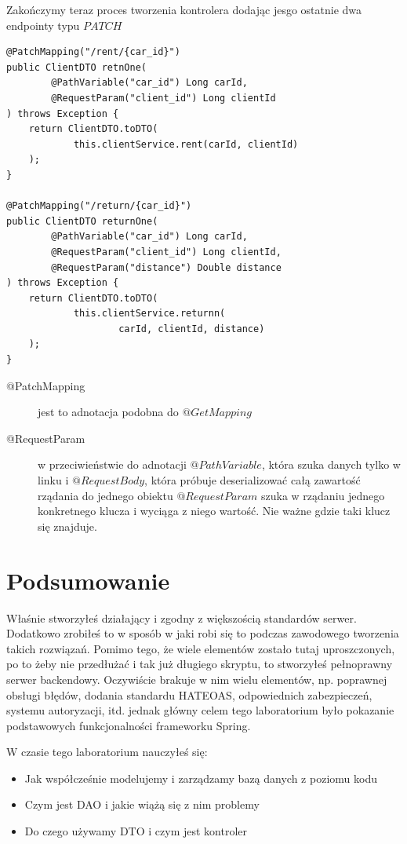 \documentclass{article}
\begin{document}
                Zakończymy teraz proces tworzenia kontrolera dodając jesgo ostatnie dwa endpointy typu $PATCH$
                \begin{verbatim}
@PatchMapping("/rent/{car_id}")
public ClientDTO retnOne(
        @PathVariable("car_id") Long carId,
        @RequestParam("client_id") Long clientId
) throws Exception {
    return ClientDTO.toDTO(
            this.clientService.rent(carId, clientId)
    );
}

@PatchMapping("/return/{car_id}")
public ClientDTO returnOne(
        @PathVariable("car_id") Long carId,
        @RequestParam("client_id") Long clientId,
        @RequestParam("distance") Double distance
) throws Exception {
    return ClientDTO.toDTO(
            this.clientService.returnn(
                    carId, clientId, distance)
    );
}
                \end{verbatim}
                \begin{description}
                    \item[@PatchMapping] jest to adnotacja podobna do $@GetMapping$ 
                    \item[@RequestParam] w przeciwieństwie do adnotacji $@PathVariable$, która szuka danych tylko w linku i $@RequestBody$, która próbuje deserializować całą zawartość rządania do jednego obiektu $@RequestParam$ szuka w rządaniu jednego konkretnego klucza i wyciąga z niego wartość. Nie ważne gdzie taki klucz się znajduje. 
                \end{description}
    \section{Podsumowanie}
        Właśnie stworzyłeś działający i zgodny z większością standardów serwer. Dodatkowo zrobiłeś to w sposób w jaki robi się to podczas zawodowego tworzenia takich rozwiązań. Pomimo tego, że wiele elementów zostało tutaj uproszczonych, po to żeby nie przedłużać i tak już długiego skryptu, to stworzyłeś pełnoprawny serwer backendowy. Oczywiście brakuje w nim wielu elementów, np. poprawnej obsługi błędów, dodania standardu HATEOAS, odpowiednich zabezpieczeń, systemu autoryzacji, itd. jednak główny celem tego laboratorium było pokazanie podstawowych funkcjonalności frameworku Spring.
        
        W czasie tego laboratorium nauczyłeś się:
        \begin{itemize}
            \item Jak współcześnie modelujemy i zarządzamy bazą danych z poziomu kodu
            \item Czym jest DAO i jakie wiążą się z nim problemy
            \item Do czego używamy DTO i czym jest kontroler
        \end{itemize}
\end{document}

